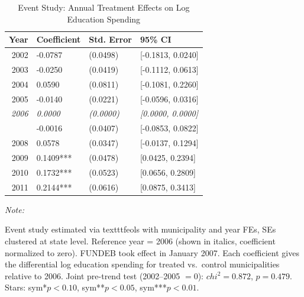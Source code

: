 \begin{table}[!h]
\centering
\caption{\label{tab:eventstudy}Event Study: Annual Treatment Effects on Log Education Spending}
\centering
\begin{threeparttable}
\begin{tabular}[t]{rlll}
\toprule
Year & Coefficient & Std. Error & 95\% CI\\
\midrule
2002 & -0.0787 & (0.0498) & {}[-0.1813, 0.0240]\\
2003 & -0.0250 & (0.0419) & {}[-0.1112, 0.0613]\\
2004 & 0.0590 & (0.0811) & {}[-0.1081, 0.2260]\\
2005 & -0.0140 & (0.0221) & {}[-0.0596, 0.0316]\\
\em{2006} & \em{0.0000} & \em{(0.0000)} & \em{{}[0.0000, 0.0000]}\\
\addlinespace
2007 & -0.0016 & (0.0407) & {}[-0.0853, 0.0822]\\
2008 & 0.0578 & (0.0347) & {}[-0.0137, 0.1294]\\
2009 & 0.1409*** & (0.0478) & {}[0.0425, 0.2394]\\
2010 & 0.1732*** & (0.0523) & {}[0.0656, 0.2809]\\
2011 & 0.2144*** & (0.0616) & {}[0.0875, 0.3413]\\
\bottomrule
\end{tabular}
\begin{tablenotes}
\item \textit{Note: } 
\item Event study estimated via texttt{feols} with municipality and year FEs, SEs clustered at state level. Reference year = 2006 (shown in italics, coefficient normalized to zero). FUNDEB took effect in January 2007. Each coefficient gives the differential log education spending for treated vs.~control municipalities relative to 2006. Joint pre-trend test (2002--2005 $= 0$): $chi^2 = 0.872$, $p = 0.479$. Stars: sym{*}$p<0.10$, sym{**}$p<0.05$, sym{***}$p<0.01$.
\end{tablenotes}
\end{threeparttable}
\end{table}
